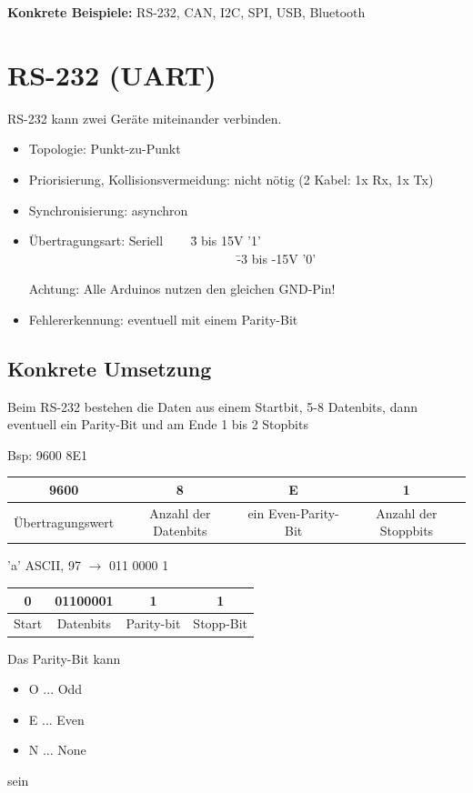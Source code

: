 \textbf{Konkrete Beispiele:} RS-232, CAN, I2C, SPI, USB, Bluetooth

\section{RS-232 (UART)}
RS-232 kann zwei Geräte miteinander verbinden.
\begin{itemize}
	\item Topologie: Punkt-zu-Punkt
	\item Priorisierung, Kollisionsvermeidung: nicht nötig (2 Kabel: 1x Rx, 1x Tx)
	\item Synchronisierung: asynchron
	\item \begin{tabbing}
		Übertragungsart: Seriell ~~~ \= 3 bis 15V '1' \\
		~~~~~~~~~~~~~~~~~~~~~~~~~~~~~~~~ \= -3 bis -15V '0'
	\end{tabbing}
	Achtung: Alle Arduinos nutzen den gleichen GND-Pin!
	\item Fehlererkennung: eventuell mit einem Parity-Bit
\end{itemize}

\subsection*{Konkrete Umsetzung}
Beim RS-232 bestehen die Daten aus einem Startbit, 5-8 Datenbits, dann eventuell ein Parity-Bit und am Ende 1 bis 2 Stopbits

Bsp: 9600 8E1 \\
\begin{tabular}{c|c|c|c}
	9600&8&E&1 \\
	\hline
	Übertragungswert&Anzahl der Datenbits&ein Even-Parity-Bit&Anzahl der Stoppbits \\
\end{tabular}


'a' ASCII, 97 $\rightarrow$ 011 0000 1 \\

\begin{tabular}{c|c|c|c}
	0 & 01100001 & 1 & 1 \\
	\hline
	Start & Datenbits & Parity-bit & Stopp-Bit \\
\end{tabular}

Das Parity-Bit kann
\begin{itemize}
	\item O ... Odd
	\item E ... Even
	\item N ... None
\end{itemize}
sein

